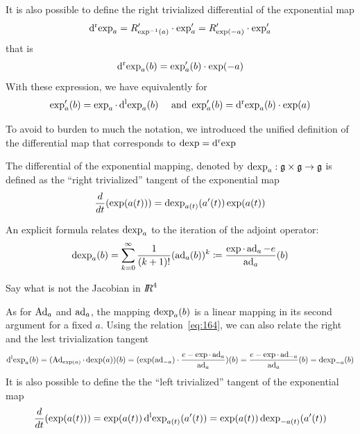 It is also possible to define the right trivialized differential of the exponential map
\begin{equation}
  \label{eq:162}
  \operatorname{d^r exp}_a = R'_{\exp^{-1}(a)} \cdot \exp_a' = R'_{\exp(-a)} \cdot \exp_a'
\end{equation}
that is
\begin{equation}
  \label{eq:163}
  \operatorname{d^r exp}_a(b) = \exp'_a(b) \cdot \exp(-a)
\end{equation}
With these expression, we have equivalently for
\begin{equation}
  \label{eq:157}
   \exp_a'(b)  = \exp_a \cdot \operatorname{d^l exp}_a(b)\quad \text{ and } \exp_a'(b)  = \operatorname{d^r exp}_a(b) \cdot   \exp(a)
\end{equation}


To avoid to burden to much the notation, we introduced the unified definition of the differential map  that corresponds to $\operatorname{dexp}=\operatorname{d^r exp}$
\begin{definition}
The differential of the exponential mapping, denoted by $\operatorname{dexp}_a : \mathfrak g \times \mathfrak g \rightarrow \mathfrak g$ is defined as the ``right trivialized'' tangent of the exponential map
\begin{equation}
  \label{eq:42}
  \frac{d}{dt} (\exp(a(t))) = \operatorname{dexp}_{a(t)}(a'(t)) \exp(a(t))
\end{equation}
\end{definition}
An explicit formula relates $\operatorname{dexp}_{a}$ to the iteration of the adjoint operator:
\begin{equation}
  \label{eq:43}
  \operatorname{dexp}_a(b) = \sum_{k=0}^\infty \frac{1}{(k+1)!} (\operatorname{ad}_a(b))^k \coloneqq \frac{\exp\cdot\operatorname{ad}_a-e}{\operatorname{ad}_a}(b)
\end{equation}


\begin{ndrva}
  Say what is not the Jacobian in $\mbox{\rm $I\!\!R$}^4$
\end{ndrva}

As for $\operatorname{Ad}_a$ and $\operatorname{ad}_a$, the mapping $\operatorname{dexp}_{a}(b)$ is a linear mapping in its second argument for a fixed $a$. Using the relation~\eqref{eq:164}, we can also relate the right and the lest trivialization tangent
\begin{equation}
  \label{eq:165}
\operatorname{d^l exp}_a (b) =   (\operatorname{Ad}_{\exp(a)} \cdot \operatorname{dexp}(a))(b) = (\exp(\operatorname{ad}_{-a}) \cdot \frac{e - \exp\cdot\operatorname{ad}_a}{\operatorname{ad}_a})(b) = \frac{e - \exp\cdot\operatorname{ad}_{-a}}{\operatorname{ad}_a}(b) = \operatorname{dexp}_{-a}(b)
\end{equation}
It is also possible to define the  the ``left trivialized'' tangent of the exponential map
\begin{equation}
  \label{eq:46}
   \frac{d}{dt} (\exp(a(t))) =  \exp(a(t)) \operatorname{d^l exp}_{a(t)}(a'(t)) = \exp(a(t)) \operatorname{dexp}_{-a(t)}(a'(t))
\end{equation}

